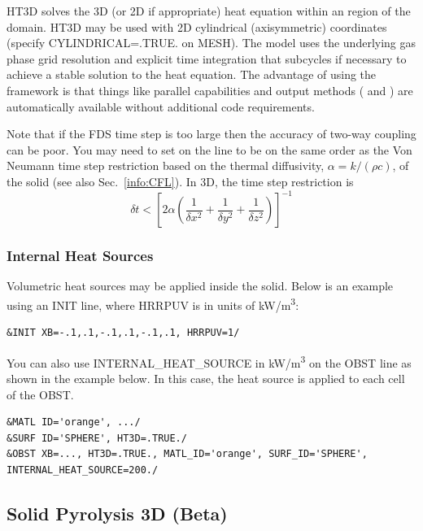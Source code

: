 \documentclass[11pt]{book}
\begin{document}
{\ct HT3D} solves the 3D (or 2D if appropriate) heat equation within an {} region of the domain.  {\ct HT3D} may be used with 2D cylindrical (axisymmetric) coordinates (specify {\ct CYLINDRICAL=.TRUE.} on {\ct MESH}).  The model uses the underlying gas phase grid resolution and explicit time integration that subcycles if necessary to achieve a stable solution to the heat equation.  The advantage of using the {} framework is that things like parallel capabilities and output methods ({} and {}) are automatically available without additional code requirements.

Note that if the FDS time step is too large then the accuracy of two-way coupling can be poor.  You may need to set {} on the {} line to be on the same order as the Von Neumann time step restriction based on the thermal diffusivity, $\alpha = k/(\rho c)$, of the solid (see also Sec.~\ref{info:CFL}).  In 3D, the time step restriction is
\begin{equation}
\label{eq:vnht3d}
\delta t < \left[ 2 \alpha \left( \frac{1}{\delta x^2} + \frac{1}{\delta y^2} + \frac{1}{\delta z^2} \right) \right]^{-1}
\end{equation}

\subsubsection{Internal Heat Sources}

Volumetric heat sources may be applied inside the solid.  Below is an example using an {\ct INIT} line, where {\ct HRRPUV} is in units of \si{kW/m^3}:
\begin{lstlisting}
&INIT XB=-.1,.1,-.1,.1,-.1,.1, HRRPUV=1/
\end{lstlisting}

You can also use {\ct INTERNAL\_HEAT\_SOURCE} in \si{kW/m^3} on the {\ct OBST} line as shown in the example below.  In this case, the heat source is applied to each cell of the {\ct OBST}.
\begin{lstlisting}
&MATL ID='orange', .../
&SURF ID='SPHERE', HT3D=.TRUE./
&OBST XB=..., HT3D=.TRUE., MATL_ID='orange', SURF_ID='SPHERE', INTERNAL_HEAT_SOURCE=200./
\end{lstlisting}

\subsection{Solid Pyrolysis 3D (Beta)}
\label{info:pyro3d}
\end{document}
